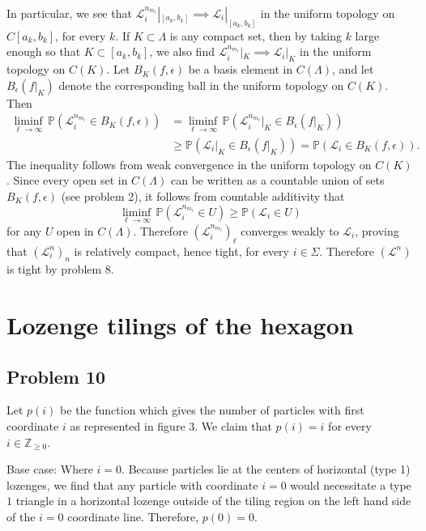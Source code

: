 \documentclass[12pt]{article}
\begin{document}
		In particular, we see that $\mathcal{L}_i^{n_{m_\ell}}|_{[a_k,b_k]} \implies \mathcal{L}_i|_{[a_k,b_k]}$ in the uniform topology on $C[a_k,b_k]$, for every $k$. If $K\subset\Lambda$ is any compact set, then by taking $k$ large enough so that $K\subset [a_k,b_k]$, we also find $\mathcal{L}_i^{n_{m_\ell}}|_K \implies \mathcal{L}_i|_K$ in the uniform topology on $C(K)$. Let $B_K(f,\epsilon)$ be a basis element in $C(\Lambda)$, and let $B_\epsilon(f|_K)$ denote the corresponding ball in the uniform topology on $C(K)$. Then
		\begin{align*}
		\liminf_{\ell\to\infty}\,\mathbb{P}(\mathcal{L}^{n_{m_\ell}}_i \in B_K(f,\epsilon)) &= \liminf_{\ell\to\infty}\,\mathbb{P}(\mathcal{L}^{n_{m_\ell}}_i|_K \in B_\epsilon(f|_K))\\
		& \geq \mathbb{P}(\mathcal{L}_i|_K \in B_\epsilon(f|_K)) = \mathbb{P}(\mathcal{L}_i \in B_K(f,\epsilon)).
		\end{align*}
		The inequality follows from weak convergence in the uniform topology on $C(K)$. Since every open set in $C(\Lambda)$ can be written as a countable union of sets $B_K(f,\epsilon)$ (see problem 2), it follows from countable additivity that
		\[
		\liminf_{\ell\to\infty}\,\mathbb{P}(\mathcal{L}^{n_{m_\ell}}_i \in U) \geq \mathbb{P}(\mathcal{L}_i \in U)
		\]
		for any $U$ open in $C(\Lambda)$. Therefore $(\mathcal{L}_i^{n_{m_\ell}})_\ell$ converges weakly to $\mathcal{L}_i$, proving that $(\mathcal{L}^n_i)_n$ is relatively compact, hence tight, for every $i\in\Sigma$. Therefore $(\mathcal{L}^n)$ is tight by problem 8.


\section{Lozenge tilings of the hexagon}
                                                                                                                                                                                                                  
	\subsection*{Problem 10}
	Let $p(i)$ be the function which gives the number of particles with first coordinate $i$ as represented in figure 3. We claim that $p(i)=i$ for every $i\in\mathbb{Z}_{\geq 0}$.
	
	Base case: Where $i=0$. Because particles lie at the centers of horizontal (type 1) lozenges, we find that any particle with coordinate $i=0$ would necessitate a type $1$ triangle in a horizontal lozenge outside of the tiling region on the left hand side of the $i=0$ coordinate line. Therefore, $p(0)=0$.
	
\end{document}
